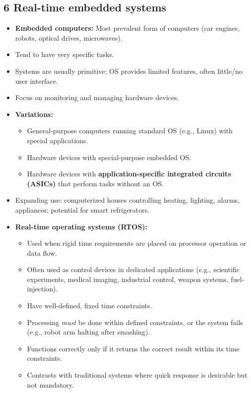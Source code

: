 \documentclass{article}
\begin{document}
\subsection*{6 Real-time embedded systems}
\begin{itemize}
    \item \textbf{Embedded computers:} Most prevalent form of computers (car engines, robots, optical drives, microwaves).
    \item Tend to have very specific tasks.
    \item Systems are usually primitive; OS provides limited features, often little/no user interface.
    \item Focus on monitoring and managing hardware devices.
    \item \textbf{Variations:}
    \begin{itemize}
        \item General-purpose computers running standard OS (e.g., Linux) with special applications.
        \item Hardware devices with special-purpose embedded OS.
        \item Hardware devices with \textbf{application-specific integrated circuits (ASICs)} that perform tasks without an OS.
    \end{itemize}
    \item Expanding use: computerized houses controlling heating, lighting, alarms, appliances; potential for smart refrigerators.
    \item \textbf{Real-time operating systems (RTOS):}
    \begin{itemize}
        \item Used when rigid time requirements are placed on processor operation or data flow.
        \item Often used as control devices in dedicated applications (e.g., scientific experiments, medical imaging, industrial control, weapon systems, fuel-injection).
        \item Have well-defined, fixed time constraints.
        \item Processing \textit{must} be done within defined constraints, or the system fails (e.g., robot arm halting after smashing).
        \item Functions correctly only if it returns the correct result within its time constraints.
        \item Contrasts with traditional systems where quick response is desirable but not mandatory.
    \end{itemize}
\end{itemize}
\end{document}
